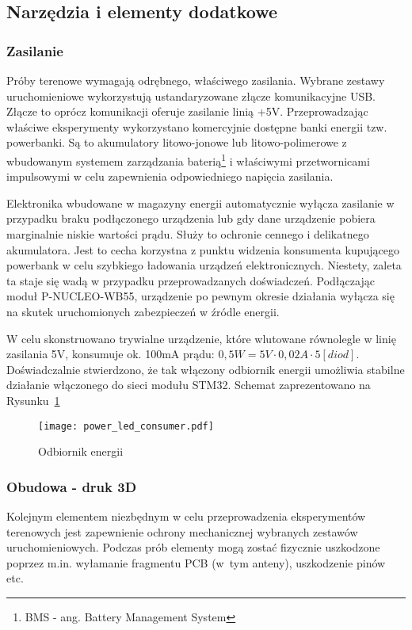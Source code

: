 \subsection{Narzędzia i elementy dodatkowe}

\subsubsection{Zasilanie}
Próby terenowe wymagają odrębnego, właściwego zasilania. Wybrane zestawy uruchomieniowe
wykorzystują ustandaryzowane złącze komunikacyjne USB. Złącze to oprócz komunikacji
oferuje zasilanie linią +5V. Przeprowadzając właściwe eksperymenty wykorzystano
komercyjnie dostępne banki energii tzw. powerbanki. Są to akumulatory litowo-jonowe
lub litowo-polimerowe z wbudowanym systemem zarządzania baterią\footnote{\gls{BMS} - ang. Battery Management System}
i właściwymi przetwornicami impulsowymi w celu zapewnienia odpowiedniego napięcia zasilania.

Elektronika wbudowane w magazyny energii automatycznie wyłącza zasilanie w przypadku braku
podłączonego urządzenia lub gdy dane urządzenie pobiera marginalnie niskie wartości
prądu. Służy to ochronie cennego i delikatnego akumulatora. Jest to cecha korzystna
z punktu widzenia konsumenta kupującego powerbank w celu szybkiego ładowania urządzeń elektronicznych.
Niestety, zaleta ta staje się wadą w przypadku przeprowadzanych doświadczeń. Podłączając moduł P-NUCLEO-WB55,
urządzenie po pewnym okresie działania wyłącza się na skutek uruchomionych zabezpieczeń w źródle energii.

W celu skonstruowano trywialne urządzenie, które wlutowane równolegle w linię zasilania 5V,
konsumuje ok. 100mA prądu: $0,5W = 5V \cdot 0,02A \cdot 5 [diod]$. Doświadczalnie stwierdzono, że tak włączony
odbiornik energii umożliwia stabilne działanie włączonego do sieci modułu STM32. Schemat 
zaprezentowano na Rysunku~\ref{rys:power_led_consumer}

\begin{figure}[!ht]
	\centering \texttt{[image: power\_led\_consumer.pdf]}
	\caption{Odbiornik energii}
	\label{rys:power_led_consumer}
\end{figure}

\subsubsection{Obudowa - druk 3D}
Kolejnym elementem niezbędnym w celu przeprowadzenia eksperymentów terenowych jest zapewnienie
ochrony mechanicznej wybranych zestawów uruchomieniowych. Podczas prób elementy mogą zostać
fizycznie uszkodzone poprzez m.in. wyłamanie fragmentu \gls{PCB} (w~tym anteny), uszkodzenie pinów etc.

